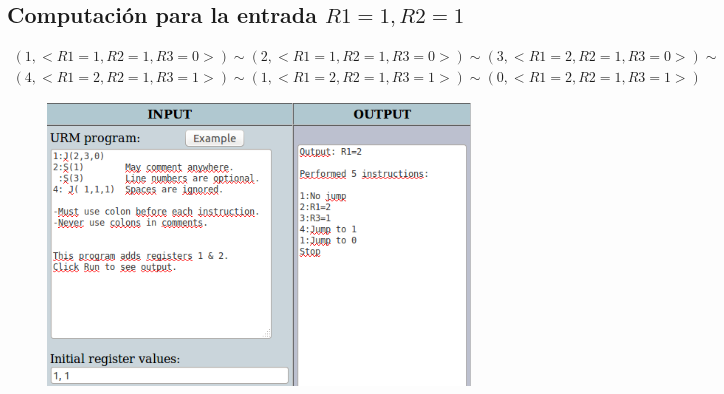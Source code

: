 		\subsection{Computación para la entrada $R1=1, R2=1$}
		\begin{equation*}\begin{gathered}
		(1, <R1=1, R2=1, R3=0>) \sim (2, <R1=1, R2=1, R3=0>) \sim (3, <R1=2, R2=1, R3=0>) \sim\\
		(4, <R1=2, R2=1, R3=1>) \sim (1, <R1=2, R2=1, R3=1>) \sim (0, <R1=2, R2=1, R3=1>)
		\end{gathered}\end{equation*}
		\begin{figure}[H]
  			\centering
  			\includegraphics[scale=0.5]{images/111.png}
  		\end{figure}
